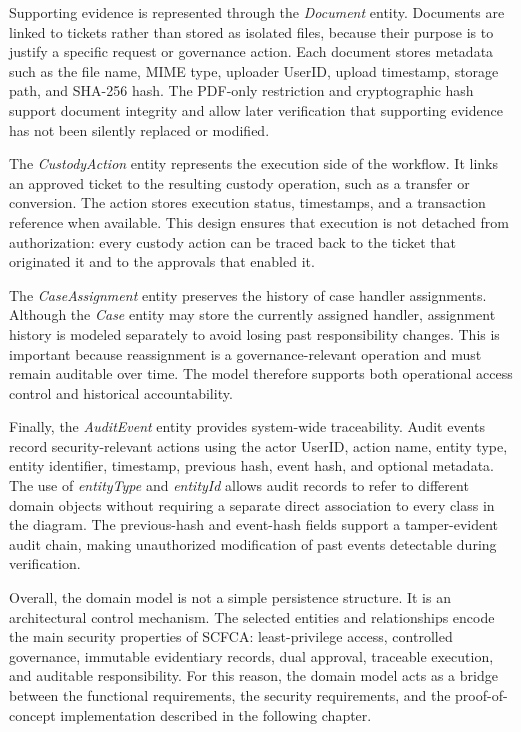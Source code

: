\documentclass[12pt,a4paper]{report}
\begin{document}
Supporting evidence is represented through the \textit{Document} entity. Documents are
linked to tickets rather than stored as isolated files, because their purpose is to justify
a specific request or governance action. Each document stores metadata such as the file
name, MIME type, uploader UserID, upload timestamp, storage path, and SHA-256 hash.
The PDF-only restriction and cryptographic hash support document integrity and allow
later verification that supporting evidence has not been silently replaced or modified.

The \textit{CustodyAction} entity represents the execution side of the workflow. It links
an approved ticket to the resulting custody operation, such as a transfer or conversion.
The action stores execution status, timestamps, and a transaction reference when
available. This design ensures that execution is not detached from authorization: every
custody action can be traced back to the ticket that originated it and to the approvals
that enabled it.

The \textit{CaseAssignment} entity preserves the history of case handler assignments.
Although the \textit{Case} entity may store the currently assigned handler, assignment
history is modeled separately to avoid losing past responsibility changes. This is important
because reassignment is a governance-relevant operation and must remain auditable over
time. The model therefore supports both operational access control and historical
accountability.

Finally, the \textit{AuditEvent} entity provides system-wide traceability. Audit events
record security-relevant actions using the actor UserID, action name, entity type, entity
identifier, timestamp, previous hash, event hash, and optional metadata. The use of
\textit{entityType} and \textit{entityId} allows audit records to refer to different domain
objects without requiring a separate direct association to every class in the diagram.
The previous-hash and event-hash fields support a tamper-evident audit chain, making
unauthorized modification of past events detectable during verification.

Overall, the domain model is not a simple persistence structure. It is an architectural
control mechanism. The selected entities and relationships encode the main security
properties of SCFCA: least-privilege access, controlled governance, immutable evidentiary
records, dual approval, traceable execution, and auditable responsibility. For this reason,
the domain model acts as a bridge between the functional requirements, the security
requirements, and the proof-of-concept implementation described in the following chapter.
\end{document}
